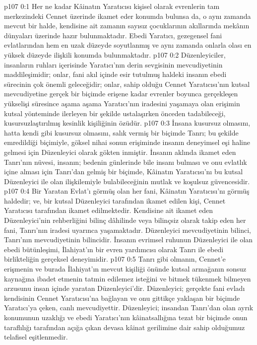 \vs p107 0:1 Her ne kadar Kâinatın Yaratıcısı kişisel olarak evrenlerin tam merkezindeki Cennet üzerinde ikamet eder konumda bulunsa da, o aynı zamanda mevcut bir halde, kendisine ait zamanın sayısız çocuklarının akıllarında mekânın dünyaları üzerinde hazır bulunmaktadır. Ebedi Yaratıcı, gezegensel fani evlatlarından hem en uzak düzeyde soyutlanmış ve aynı zamanda onlarla olası en yüksek düzeyde ilişkili konumda bulunmaktadır.
\vs p107 0:2 Düzenleyiciler, insanların ruhları içerisinde Yaratıcı’nın derin sevgisinin mevcudiyetinin maddileşimidir; onlar, fani akıl içinde esir tutulmuş haldeki insanın ebedi sürecinin çok önemli geleceğidir; onlar, sahip olduğu Cennet Yaratıcısı’nın kutsal mevcudiyetine gerçek bir biçimde erişene kadar evrenler boyunca gerçekleşen yükselişi süresince aşama aşama Yaratıcı’nın iradesini yaşamaya olan erişimin kutsal yönteminde ilerleyen bir şekilde ustalaşırken önceden tadabileceği, kusursuzlaştırılmış kesinlik kişiliğinin özüdür.
\vs p107 0:3 İnsana kusursuz olmasını, hatta kendi gibi kusursuz olmasını, salık vermiş bir biçimde Tanrı; bu şekilde emredildiği biçimiyle, göksel nihai sonun erişiminde insanın deneyimsel eşi haline gelmesi için Düzenleyici olarak gökten inmiştir. İnsanın aklında ikamet eden Tanrı’nın nüvesi, insanın; bedenin günlerinde bile insanı bulması ve onu evlatlık içine alması için Tanrı’dan gelmiş bir biçimde, Kâinatın Yaratıcısı’nı bu kutsal Düzenleyici ile olan ilişkilemiyle bulabileceğinin mutlak ve koşulsuz güvencesidir.
\vs p107 0:4 Bir Yaratan Evlat’ı görmüş olan her fani, Kâinatın Yaratıcısı’nı görmüş haldedir; ve, bir kutsal Düzenleyici tarafından ikamet edilen kişi, Cennet Yaratıcısı tarafından ikamet edilmektedir. Kendisine ait ikamet eden Düzenleyici’nin rehberliğini bilinç dâhilinde veya bilinçsiz olarak takip eden her fani, Tanrı’nın iradesi uyarınca yaşamaktadır. Düzenleyici mevcudiyetinin bilinci, Tanrı’nın mevcudiyetinin bilincidir. İnsanın evrimsel ruhunun Düzenleyici ile olan ebedi bütünleşimi, İlahiyat’ın bir evren yardımcısı olarak Tanrı ile ebedi birlikteliğin gerçeksel deneyimidir.
\vs p107 0:5 Tanrı gibi olmanın, Cennet’e erişmenin ve burada İlahiyat’ın mevcut kişiliği önünde kutsal armağanın sonsuz kaynağına ibadet etmenin tatmin edilemez isteğini ve bitmek tükenmek bilmeyen arzusunu insan içinde yaratan Düzenleyici’dir. Düzenleyici; gerçekte fani evladı kendisinin Cennet Yaratıcısı’na bağlayan ve onu gittikçe yaklaşan bir biçimde Yaratıcı’ya çeken, canlı mevcudiyettir. Düzenleyici; insandan Tanrı’dan olan ayrık konumunun uzaklığı ve ebedi Yaratıcı’nın kâinatsallığına tezat bir biçimde onun taraflılığı tarafından açığa çıkan devasa kâinat gerilimine dair sahip olduğumuz telafisel eşitlenmedir.
